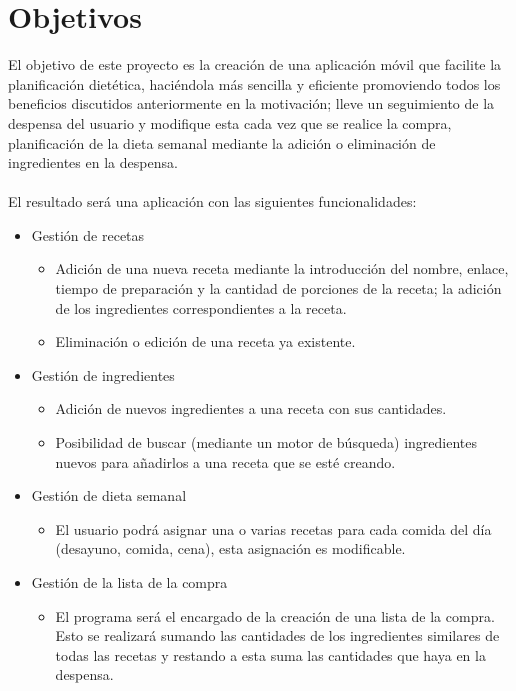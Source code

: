 \documentclass[twoside, openright, 11pt]{report}
\begin{document}
  \section{Objetivos} 
  El objetivo de este proyecto es la creación de una aplicación móvil que facilite la planificación dietética, haciéndola más sencilla y eficiente promoviendo todos los beneficios discutidos anteriormente en la motivación; lleve un seguimiento de la despensa del usuario y modifique esta cada vez que se realice la compra, planificación de la dieta semanal mediante la adición o eliminación de ingredientes en la despensa.
  \\
  \\
  El resultado será una aplicación con las siguientes funcionalidades:
  
  
  \begin{itemize}
  	\item Gestión de recetas
  	\begin{itemize}
  		\item Adición de una nueva receta mediante la introducción del nombre, enlace, tiempo de preparación y la cantidad de porciones de la receta; la adición de los ingredientes correspondientes a la receta.
  		\item Eliminación o edición de una receta ya existente.
  	\end{itemize}
  	
  	\item Gestión de ingredientes
  	\begin{itemize}
  		\item Adición de nuevos ingredientes a una receta con sus cantidades.
  		\item Posibilidad de buscar (mediante un motor de búsqueda) ingredientes nuevos para añadirlos a una receta que se esté creando.
  	\end{itemize}
  	
  	\item Gestión de dieta semanal
  	\begin{itemize}
  		\item El usuario podrá asignar una o varias recetas para cada comida del día (desayuno, comida, cena), esta asignación es modificable.
  	\end{itemize}
  	
  	\item Gestión de la lista de la compra
  	\begin{itemize}
  		\item El programa será el encargado de la creación de una lista de la compra. Esto se realizará sumando las cantidades de los ingredientes similares de todas las recetas y restando a esta suma las cantidades que haya en la despensa.
  	\end{itemize}
  \end{itemize}
  
\end{document}
